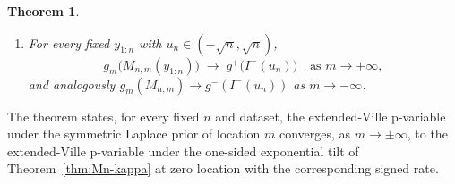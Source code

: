 \documentclass[numsec,webpdf,modern,medium,namedate]{oup-authoring-template}
\theoremstyle{thmstyleone}%
\newtheorem{theorem}{Theorem}%
\theoremstyle{thmstyletwo}%
\theoremstyle{thmstylethree}%
\newcommand{\E}{\mathbb{E}}
\newcommand{\1}{\mathbf{1}}
\begin{document}
\begin{theorem}
\begin{enumerate}
\begin{equation}
  g_m(c) \;:=\; \E_0\!\left[\min\!\Bigl(\tfrac{M_{2,m}(U_2)}{c},\,1\Bigr)\right],
  \quad
  g^\pm(c) \;:=\; \E_0\!\left[\min\!\Bigl(\tfrac{I^\pm(U_2)}{c},\,1\Bigr)\right],
  \quad c>0.
\end{equation}
    \item[(c)] For every fixed $y_{1:n}$ with
$u_n\in(-\sqrt n,\sqrt n)$,
\begin{equation}\label{eq:p-conv-Lap}
  g_m\!\bigl(M_{n,m}(y_{1:n})\bigr)
  \;\longrightarrow\; g^+\!\bigl(I^+(u_n)\bigr)
  \quad\text{as }m\to+\infty,
\end{equation}
and analogously $g_m(M_{n,m})\to g^-(I^-(u_n))$ as $m\to-\infty$.
\end{enumerate}
\end{theorem}
The theorem states, for every fixed $n$ and dataset, the extended-Ville p-variable under the symmetric Laplace prior of location $m$ converges, as
$m\to\pm\infty$, to the extended-Ville p-variable under the one-sided exponential tilt of Theorem~\ref{thm:Mn-kappa} at zero location with
the corresponding signed rate.
\end{document}
